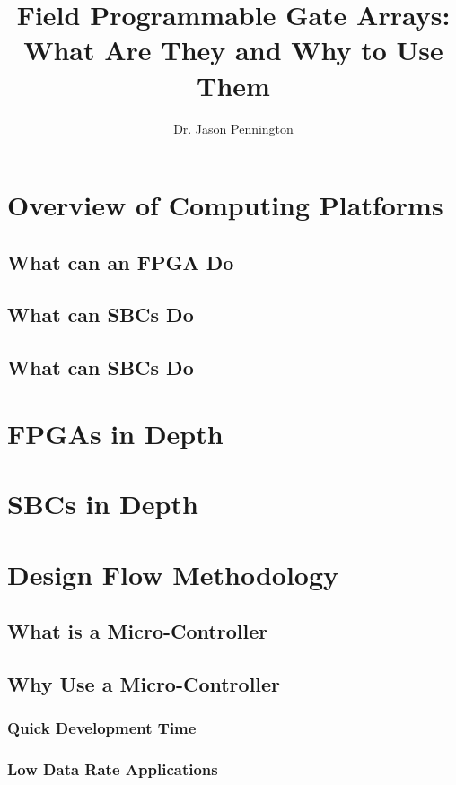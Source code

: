 \documentclass[]{book}
\title{Field Programmable Gate Arrays: What Are They and Why to Use Them}
\author{Dr. Jason Pennington}
\begin{document}
\maketitle

\tableofcontents

%
\chapter{Overview of Computing Platforms}
\section{What can an FPGA Do}
\section{What can SBCs Do}
\section{What can SBCs Do}

%
\chapter{FPGAs in Depth}

%
\chapter{SBCs in Depth}

%
\chapter{Design Flow Methodology}

%


\section{What is a Micro-Controller}
\section{Why Use a Micro-Controller}
\subsection{Quick Development Time}
\subsection{Low Data Rate Applications}
\end{document}
